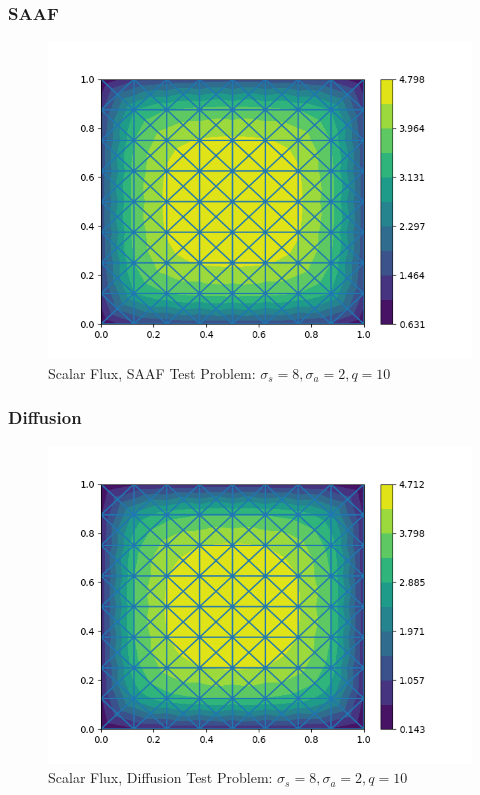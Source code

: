 \subsubsection{SAAF}
\begin{figure}[H]
    \centering
    \includegraphics[width=\textwidth]{fig/saaf_scat.png}
    \caption{Scalar Flux, SAAF Test Problem: $\sigma_s = 8, \sigma_a = 2, q=10$}
    \label{fig:SAAF_scatter}
\end{figure}
\subsubsection{Diffusion}
\begin{figure}[H]
    \centering
    \includegraphics[width=\textwidth]{fig/diff_scat.png}
    \caption{Scalar Flux, Diffusion Test Problem: $\sigma_s = 8, \sigma_a = 2, q=10$}
    \label{fig:diff_scatter}
\end{figure}
